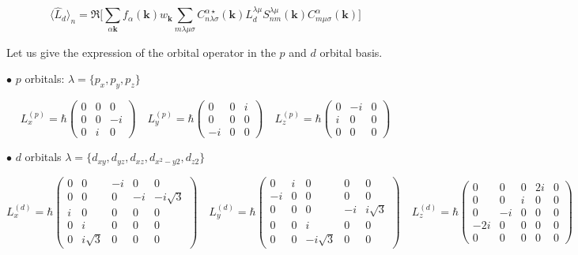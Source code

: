 \documentclass{article}
\newcommand{\op}[1]{\hat{#1}}
\begin{document}
\[ \langle \op{L}_d \rangle_n = \Re \Bigg [ \sum_{\alpha \mathbf{k}} f_{\alpha}(\mathbf{k}) w_{\mathbf{k}}\sum_{m \lambda \mu \sigma} C_{n \lambda \sigma}^{\alpha \star}(\mathbf{k}) L_{d}^{\lambda \mu} S_{nm}^{\lambda \mu}(\mathbf{k})C_{m \mu \sigma}^{\alpha}(\mathbf{k}) \Bigg ]\]

\noindent
Let us give the expression of the orbital operator in the $p$ and $d$ orbital basis.

\vspace{0.5cm}
\noindent
$\bullet$ $p$ orbitals: $\lambda=\{p_x,p_y,p_z\}$ 

\begin{equation*}
L_x^{(p)} = \hbar \begin{pmatrix}
 0 & 0 & 0 \\
 0 & 0 & -i \\
 0 & i & 0
\end{pmatrix}
\quad
L_y^{(p)} = \hbar \begin{pmatrix}
 0 &  0 & i \\
 0 &  0 & 0 \\
-i &  0 & 0
\end{pmatrix}
\quad
L_z^{(p)} = \hbar \begin{pmatrix}
 0 & -i &  0 \\
 i &  0 &  0 \\
 0 &  0 &  0
\end{pmatrix}
\end{equation*}

 \vspace{0.5cm}
\noindent
$\bullet$ $d$ orbitals $\lambda=\{d_{xy},d_{yz},d_{xz},d_{x^2-y2},d_{z2}\}$

\begin{equation*}
L_x^{(d)}= \hbar \begin{pmatrix}
0&0&-i&0&0 \\
0&0&0&-i&-i\sqrt{3} \\
i&0&0&0&0 \\
0&i&0&0&0  \\
0&i\sqrt{3}&0&0&0
\end{pmatrix}
\quad
L_y^{(d)}= \hbar \begin{pmatrix}
0&i&0&0&0 \\
-i&0&0&0&0 \\
0&0&0&-i&i\sqrt{3} \\
0&0&i&0&0  \\
0&0&-i\sqrt{3}&0&0
\end{pmatrix}
\quad
L_z^{(d)}= \hbar \begin{pmatrix}
0&0&0&2i&0 \\
0&0&i&0&0 \\
0&-i&0&0&0 \\
-2i&0&0&0&0  \\
0&0&0&0&0
\end{pmatrix}
\end{equation*}
\end{document}
